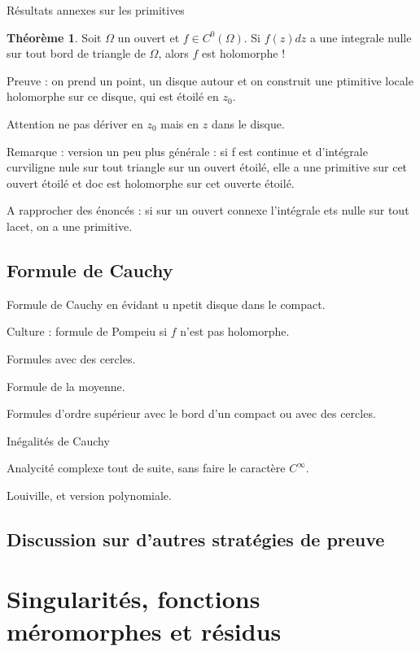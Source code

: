 \documentclass[11pt,a4paper]{book}
\theoremstyle{definition}
\newtheorem{theoreme}{Th\'eor\`eme}[section]
\theoremstyle{plain}
\begin{document}

Résultats annexes sur les primitives


\begin{theoreme}
Soit $\Omega$ un ouvert et $f \in C^0(\Omega)$.
Si $f(z)dz$ a une integrale nulle sur tout bord de triangle de $\Omega$, alors $f$ est holomorphe !
\end{theoreme}

Preuve : on prend un point, un disque autour et on construit une ptimitive locale holomorphe sur ce disque, qui est étoilé en $z_0$.

Attention ne pas dériver en $z_0$ mais en $z$ dans le disque.

Remarque  : version un peu plus générale : si f est continue et d'intégrale curviligne nule sur tout triangle sur un ouvert étoilé, elle a une primitive sur cet ouvert étoilé et doc est holomorphe sur cet ouverte étoilé.

A rapprocher des énoncés : si sur un ouvert connexe l'intégrale ets nulle sur tout lacet, on a une primitive.



\section{Formule de Cauchy}

Formule de Cauchy en évidant u npetit disque dans le compact.

Culture : formule de Pompeiu si $f$ n'est pas holomorphe.

Formules avec des cercles.

Formule de la moyenne.

Formules d'ordre supérieur avec le bord d'un compact ou avec des cercles.

Inégalités de Cauchy

Analycité complexe tout de suite, sans faire le caractère $C^\infty$.

Louiville, et version polynomiale.




\section{Discussion sur d'autres stratégies de preuve}





\chapter{Singularités, fonctions méromorphes et résidus}
\end{document}

